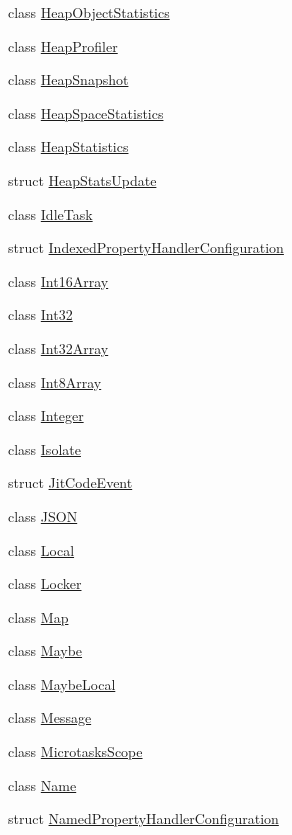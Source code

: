 \begin{DoxyCompactItemize}
\item 
class \hyperlink{classv8_1_1_heap_object_statistics}{Heap\+Object\+Statistics}
\item 
class \hyperlink{classv8_1_1_heap_profiler}{Heap\+Profiler}
\item 
class \hyperlink{classv8_1_1_heap_snapshot}{Heap\+Snapshot}
\item 
class \hyperlink{classv8_1_1_heap_space_statistics}{Heap\+Space\+Statistics}
\item 
class \hyperlink{classv8_1_1_heap_statistics}{Heap\+Statistics}
\item 
struct \hyperlink{structv8_1_1_heap_stats_update}{Heap\+Stats\+Update}
\item 
class \hyperlink{classv8_1_1_idle_task}{Idle\+Task}
\item 
struct \hyperlink{structv8_1_1_indexed_property_handler_configuration}{Indexed\+Property\+Handler\+Configuration}
\item 
class \hyperlink{classv8_1_1_int16_array}{Int16\+Array}
\item 
class \hyperlink{classv8_1_1_int32}{Int32}
\item 
class \hyperlink{classv8_1_1_int32_array}{Int32\+Array}
\item 
class \hyperlink{classv8_1_1_int8_array}{Int8\+Array}
\item 
class \hyperlink{classv8_1_1_integer}{Integer}
\item 
class \hyperlink{classv8_1_1_isolate}{Isolate}
\item 
struct \hyperlink{structv8_1_1_jit_code_event}{Jit\+Code\+Event}
\item 
class \hyperlink{classv8_1_1_j_s_o_n}{J\+S\+ON}
\item 
class \hyperlink{classv8_1_1_local}{Local}
\item 
class \hyperlink{classv8_1_1_locker}{Locker}
\item 
class \hyperlink{classv8_1_1_map}{Map}
\item 
class \hyperlink{classv8_1_1_maybe}{Maybe}
\item 
class \hyperlink{classv8_1_1_maybe_local}{Maybe\+Local}
\item 
class \hyperlink{classv8_1_1_message}{Message}
\item 
class \hyperlink{classv8_1_1_microtasks_scope}{Microtasks\+Scope}
\item 
class \hyperlink{classv8_1_1_name}{Name}
\item 
struct \hyperlink{structv8_1_1_named_property_handler_configuration}{Named\+Property\+Handler\+Configuration}

\end{DoxyCompactItemize}
